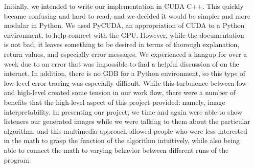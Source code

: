 \documentclass[11pt,twocolumn]{article}
\begin{document}
Initially, we intended to write our implementation in CUDA C++. This quickly became confusing and hard to read, and we decided it would be simpler and more modular in Python. We used PyCUDA, an appropriation of CUDA to a Python environment, to help connect with the GPU. However, while the documentation is not bad, it leaves something to be desired in terms of thorough explanation, return values, and especially error messages. We experienced a hangup for over a week due to an error that was impossible to find a helpful discussion of on the internet. In addition, there is no GDB for a Python environment, so this type of low-level error tracing was especially difficult. While this turbulence between low- and high-level created some tension in our work flow, there were a number of benefits that the high-level aspect of this project provided: namely, image interpretability. In presenting our project, we time and again were able to show listeners our generated images while we were talking to them about the particular algorithm, and this multimedia approach allowed people who were less interested in the math to grasp the function of the algorithm intuitively, while also being able to connect the math to varying behavior between different runs of the program.









\end{document}
